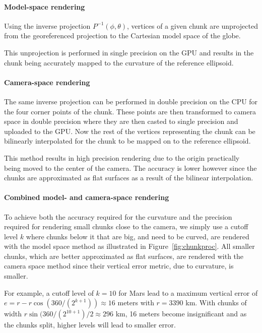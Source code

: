 \documentclass[journal]{vgtc}                %
\newcommand{\fig}[1]{Figure~\ref{fig:#1}}
\begin{document}
\paragraph{Model-space rendering}

Using the inverse projection $P^{-1}(\phi,\theta)$, vertices of a given chunk are unprojected from the georeferenced projection to the Cartesian model space of the globe.

This unprojection is performed in single precision on the GPU and results in the chunk being accurately mapped to the curvature of the reference ellipsoid.

\paragraph{Camera-space rendering}

The same inverse projection can be performed in double precision on the CPU for the four corner points of the chunk.
These points are then transformed to camera space in double precision where they are then casted to single precision and uploaded to the GPU.
Now the rest of the vertices representing the chunk can be bilinearly interpolated for the chunk to be mapped on to the reference ellipsoid.

This method results in high precision rendering due to the origin practically being moved to the center of the camera.
The accuracy is lower however since the chunks are approximated as flat surfaces as a result of the bilinear interpolation.

\paragraph{Combined model- and camera-space rendering}

To achieve both the accuracy required for the curvature and the precision required for rendering small chunks close to the camera, we simply use a cutoff level $k$ where chunks below it that are big, and need to be curved, are rendered with the model space method as illustrated in \fig{chunkproc}.
All smaller chunks, which are better approximated as flat surfaces, are rendered with the camera space method since their vertical error metric, due to curvature, is smaller.

For example, a cutoff level of $k = 10$ for Mars lead to a maximum vertical error of $e = r - r \cos{(360/(2^{k + 1}))} \approx 16$ meters with $r=3 390$ km.
With chunks of width $r \sin{(360 / (2^{10 + 1})} / 2 \approx 296$ km, 16 meters become insignificant and as the chunks split, higher levels will lead to smaller error.
\end{document}
